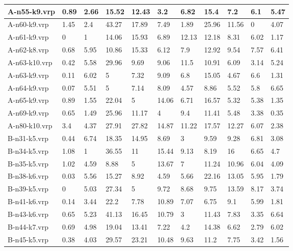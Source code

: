 \begin{table}[!ht]
\begin{tabular}{|l|l|l|l|l|l|l|l|l|l|l|}
        A-n55-k9.vrp & 0.89 & 2.66 & 15.52 & 12.43 & 3.2 & 6.82 & 15.4 & 7.2 & 6.1 & 5.47 \\ \hline
        A-n60-k9.vrp & 1.45 & 2.4 & 43.27 & 17.89 & 7.49 & 1.89 & 25.96 & 11.56 & 0 & 4.07 \\ \hline
        A-n61-k9.vrp & 0 & 1 & 14.06 & 15.93 & 6.89 & 12.13 & 12.18 & 8.31 & 6.02 & 1.17 \\ \hline
        A-n62-k8.vrp & 0.68 & 5.95 & 10.86 & 15.33 & 6.12 & 7.9 & 12.92 & 9.54 & 7.57 & 6.41 \\ \hline
        A-n63-k10.vrp & 0.42 & 5.58 & 29.96 & 9.69 & 9.06 & 11.5 & 10.91 & 6.09 & 3.14 & 5.24 \\ \hline
        A-n63-k9.vrp & 0.11 & 6.02 & 5 & 7.32 & 9.09 & 6.8 & 15.05 & 4.67 & 6.6 & 1.31 \\ \hline
        A-n64-k9.vrp & 0.07 & 5.51 & 5 & 7.14 & 8.09 & 4.57 & 8.86 & 5.52 & 5.8 & 6.65 \\ \hline
        A-n65-k9.vrp & 0.89 & 1.55 & 22.04 & 5 & 14.06 & 6.71 & 16.57 & 5.32 & 5.38 & 1.35 \\ \hline
        A-n69-k9.vrp & 0.65 & 1.49 & 25.96 & 11.17 & 4 & 9.4 & 11.41 & 5.48 & 3.38 & 0.35 \\ \hline
        A-n80-k10.vrp & 3.4 & 4.37 & 27.91 & 27.82 & 14.87 & 11.22 & 17.57 & 12.27 & 6.07 & 2.38 \\ \hline
        B-n31-k5.vrp & 0.44 & 6.74 & 18.35 & 14.95 & 8.69 & 3 & 9.59 & 9.28 & 6.81 & 3.08 \\ \hline
        B-n34-k5.vrp & 1.08 & 1 & 36.55 & 11 & 15.44 & 9.13 & 8.19 & 16 & 6.65 & 4.7 \\ \hline
        B-n35-k5.vrp & 1.02 & 4.59 & 8.88 & 5 & 13.67 & 7 & 11.24 & 10.96 & 6.04 & 4.09 \\ \hline
        B-n38-k6.vrp & 0.03 & 5.56 & 15.27 & 8.92 & 4.59 & 5.66 & 22.16 & 13.05 & 5.95 & 1.79 \\ \hline
        B-n39-k5.vrp & 0 & 5.03 & 27.34 & 5 & 9.72 & 8.68 & 9.75 & 13.59 & 8.17 & 3.74 \\ \hline
        B-n41-k6.vrp & 0.14 & 3.44 & 22.2 & 7.78 & 10.89 & 7.07 & 6.75 & 9.1 & 5.99 & 1.81 \\ \hline
        B-n43-k6.vrp & 0.65 & 5.23 & 41.13 & 16.45 & 10.79 & 3 & 11.43 & 7.83 & 3.35 & 6.64 \\ \hline
        B-n44-k7.vrp & 0.69 & 4.98 & 19.04 & 13.41 & 7.22 & 4.2 & 14.38 & 6.62 & 2.79 & 6.02 \\ \hline
        B-n45-k5.vrp & 0.38 & 4.03 & 29.57 & 23.21 & 10.48 & 9.63 & 11.2 & 7.75 & 3.42 & 1.56 \\ \hline

\end{tabular}
\end{table}
